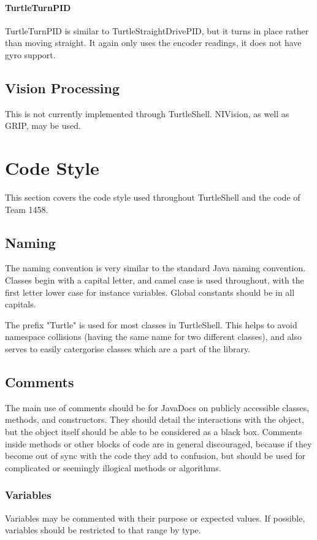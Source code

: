 \documentclass[]{report}
\begin{document}
\paragraph{TurtleTurnPID}
TurtleTurnPID is similar to TurtleStraightDrivePID, but it turns in place rather than moving straight.
It again only uses the encoder readings, it does not have gyro support.


\subsection{Vision Processing}
This is not currently implemented through TurtleShell.
NIVision, as well as GRIP, may be used.


\section{Code Style}
This section covers the code style used throughout TurtleShell and the code of Team 1458.

\subsection{Naming}
The naming convention is very similar to the standard Java naming convention.
Classes begin with a capital letter, and camel case is used throughout, with the first letter lower case for instance variables.
Global constants should be in all capitals.

The prefix "Turtle" is used for most classes in TurtleShell.
This helps to avoid namespace collisions (having the same name for two different classes), and also serves to easily catergorise classes which are a part of the library.

\subsection{Comments}
The main use of comments should be for JavaDocs on publicly accessible classes, methods, and constructors.
They should detail the interactions with the object, but the object itself should be able to be considered as a black box.
Comments inside methods or other blocks of code are in general discouraged, because if they become out of sync with the code they add to confusion, but should be used for complicated or seemingly illogical methods or algorithms.

\subsubsection{Variables}
Variables may be commented with their purpose or expected values.
If possible, variables should be restricted to that range by type.
\end{document}
